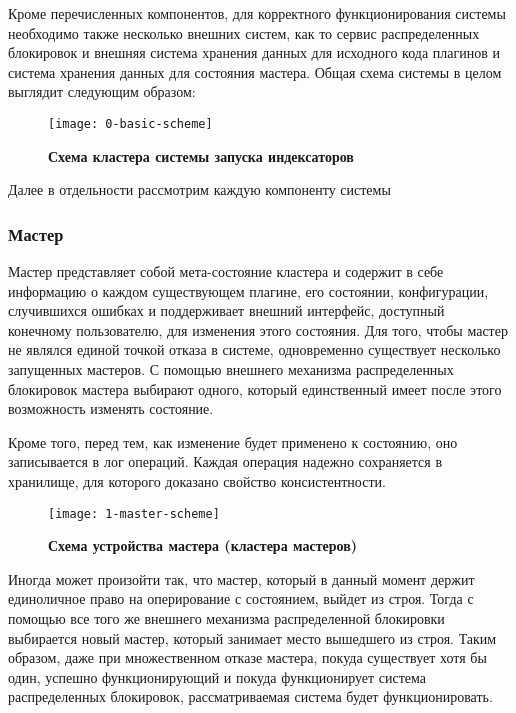 Кроме перечисленных компонентов, для корректного функционирования системы необходимо также несколько внешних систем, как то сервис распределенных блокировок и внешняя система хранения данных для исходного кода плагинов и система хранения данных для состояния мастера. Общая схема системы в целом выглядит следующим образом:

\begin{figure}[h]
	\centering
	\caption{\textbf{Схема кластера системы запуска индексаторов}}
	
	\texttt{[image: 0-basic-scheme]}
\end{figure}

Далее в отдельности рассмотрим каждую компоненту системы

\subsubsection{Мастер}

Мастер представляет собой мета-состояние кластера и содержит в себе информацию о каждом существующем плагине, его состоянии, конфигурации, случившихся ошибках и поддерживает внешний интерфейс, доступный конечному пользователю, для изменения этого состояния. Для того, чтобы мастер не являлся единой точкой отказа в системе, одновременно существует несколько запущенных мастеров. С помощью внешнего механизма распределенных блокировок мастера выбирают одного, который единственный имеет после этого возможность изменять состояние.

Кроме того, перед тем, как изменение будет применено к состоянию, оно записывается в лог операций. Каждая операция надежно сохраняется в хранилище, для которого доказано свойство консистентности.

\begin{figure}[h]
	\centering
	\caption{\textbf{Схема устройства мастера (кластера мастеров)}}
	
	\texttt{[image: 1-master-scheme]}
\end{figure}

Иногда может произойти так, что мастер, который в данный момент держит единоличное право на оперирование с состоянием, выйдет из строя. Тогда с помощью все того же внешнего механизма распределенной блокировки выбирается новый мастер, который занимает место вышедшего из строя. Таким образом, даже при множественном отказе мастера, покуда существует хотя бы один, успешно функционирующий и покуда функционирует система распределенных блокировок, рассматриваемая система будет функционировать.

